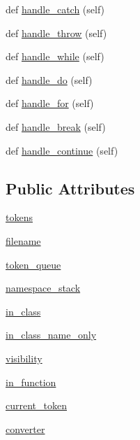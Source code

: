 \begin{DoxyCompactItemize}
\item 
def \mbox{\hyperlink{classcpp_1_1ast_1_1AstBuilder_aa38687383d0f54d26416054cf2141837}{handle\+\_\+catch}} (self)
\item 
def \mbox{\hyperlink{classcpp_1_1ast_1_1AstBuilder_ad4a308ded4a1f87e686b9e11fec31be9}{handle\+\_\+throw}} (self)
\item 
def \mbox{\hyperlink{classcpp_1_1ast_1_1AstBuilder_aac812e812ba2e5fbd80dde93be01a414}{handle\+\_\+while}} (self)
\item 
def \mbox{\hyperlink{classcpp_1_1ast_1_1AstBuilder_a540226b483513b423d4ec2c4f10b18f5}{handle\+\_\+do}} (self)
\item 
def \mbox{\hyperlink{classcpp_1_1ast_1_1AstBuilder_a0025c4d8ca779d69552e0947665eb1c4}{handle\+\_\+for}} (self)
\item 
def \mbox{\hyperlink{classcpp_1_1ast_1_1AstBuilder_a2b663a3e15e70b9d85bf17afb2bcf07a}{handle\+\_\+break}} (self)
\item 
def \mbox{\hyperlink{classcpp_1_1ast_1_1AstBuilder_a511eb003ed301a713a687e5293584077}{handle\+\_\+continue}} (self)
\end{DoxyCompactItemize}
\subsection*{Public Attributes}
\begin{DoxyCompactItemize}
\item 
\mbox{\hyperlink{classcpp_1_1ast_1_1AstBuilder_a1b21f8bef712e91862ccb6b1147cab0d}{tokens}}
\item 
\mbox{\hyperlink{classcpp_1_1ast_1_1AstBuilder_ad8b8f5788de55d6c7151e82af8b21115}{filename}}
\item 
\mbox{\hyperlink{classcpp_1_1ast_1_1AstBuilder_ae167f12797e7c02c1b60c11c83cdb22f}{token\+\_\+queue}}
\item 
\mbox{\hyperlink{classcpp_1_1ast_1_1AstBuilder_ab183aa48e4b6e116379f95eb3d11039c}{namespace\+\_\+stack}}
\item 
\mbox{\hyperlink{classcpp_1_1ast_1_1AstBuilder_a9edc1e10a3f005b463fd9316d83dd15d}{in\+\_\+class}}
\item 
\mbox{\hyperlink{classcpp_1_1ast_1_1AstBuilder_a376583354ab9afa308b7f34105bf3f4a}{in\+\_\+class\+\_\+name\+\_\+only}}
\item 
\mbox{\hyperlink{classcpp_1_1ast_1_1AstBuilder_a2f16b19846c405101235432d2666b614}{visibility}}
\item 
\mbox{\hyperlink{classcpp_1_1ast_1_1AstBuilder_ad5ac0612dfff44241033864832dbdfe3}{in\+\_\+function}}
\item 
\mbox{\hyperlink{classcpp_1_1ast_1_1AstBuilder_a38579523ccc1ae9d202ac722baea45fc}{current\+\_\+token}}
\item 
\mbox{\hyperlink{classcpp_1_1ast_1_1AstBuilder_ae8551cf0405bc6e367636b1f3b37d083}{converter}}
\end{DoxyCompactItemize}


